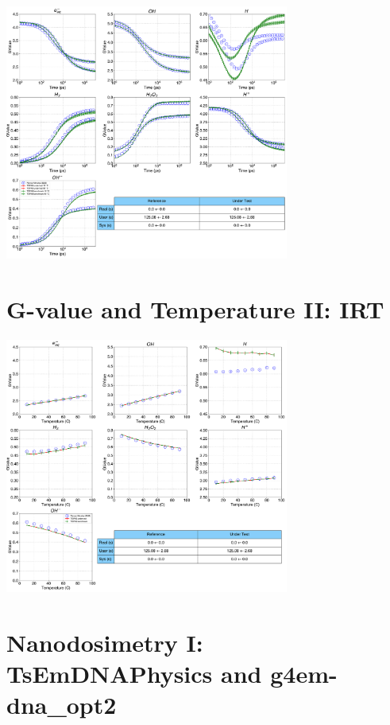 \documentclass[aspectratio=1610]{beamer}
\begin{document}
\begin{frame}{\secname}
 \centering
  \includegraphics[width=0.7\textwidth]{./GvalueIRT-Temperature/TimeEvolution}
\end{frame}

\section{G-value and Temperature II: IRT}

\begin{frame}{\secname}
 \centering
  \includegraphics[width=0.7\textwidth]{./GvalueIRT-Temperature/TemperatureEvolution}
\end{frame}

\section{Nanodosimetry I: TsEmDNAPhysics and g4em-dna\_opt2}
\end{document}
